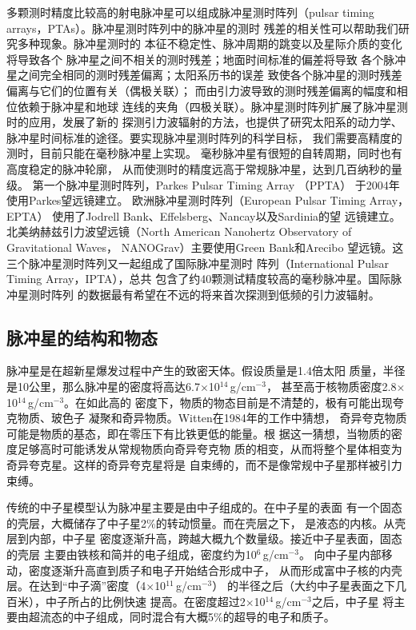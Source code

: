 多颗测时精度比较高的射电脉冲星可以组成脉冲星测时阵列（pulsar 
timing arrays，PTAs）。脉冲星测时阵列中的脉冲星的测时
残差的相关性可以帮助我们研究多种现象。脉冲星测时的
本征不稳定性、脉冲周期的跳变以及星际介质的变化将导致各个
脉冲星之间不相关的测时残差；地面时间标准的偏差将导致
各个脉冲星之间完全相同的测时残差偏离；太阳系历书的误差
致使各个脉冲星的测时残差偏离与它们的位置有关（偶极关联）；
而由引力波导致的测时残差偏离的幅度和相位依赖于脉冲星和地球
连线的夹角（四极关联）。脉冲星测时阵列扩展了脉冲星测时的应用，发展了新的
探测引力波辐射的方法，也提供了研究太阳系的动力学、
脉冲星时间标准的途径。要实现脉冲星测时阵列的科学目标，
我们需要高精度的测时，目前只能在毫秒脉冲星上实现。
毫秒脉冲星有很短的自转周期，同时也有高度稳定的脉冲轮廓，
从而使测时的精度远高于常规脉冲星，达到几百纳秒的量级。
第一个脉冲星测时阵列，Parkes Pulsar Timing Array （PPTA）
于2004年使用Parkes望远镜建立\supercite{Manchester13}。
欧洲脉冲星测时阵列（European Pulsar Timing Array，EPTA）\supercite{fvr+10}
使用了Jodrell Bank、Effelsberg、Nancay以及Sardinia的望
远镜建立。北美纳赫兹引力波望远镜（North American Nanohertz Observatory of Gravitational Waves，
NANOGrav）\supercite{jfl+09}主要使用Green Bank和Arecibo
望远镜。这三个脉冲星测时阵列又一起组成了国际脉冲星测时
阵列（International Pulsar Timing Array，IPTA），总共
包含了约40颗测试精度较高的毫秒脉冲星。国际脉冲星测时阵列
的数据最有希望在不远的将来首次探测到低频的引力波辐射。

\subsection{脉冲星的结构和物态}

脉冲星是在超新星爆发过程中产生的致密天体。假设质量是1.4倍太阳
质量，半径是10公里，那么脉冲星的密度将高达6.7$\times$10$^{14}$\,g/cm$^{-3}$，
甚至高于核物质密度2.8$\times$10$^{14}$\,g/cm$^{-3}$。在如此高的
密度下，物质的物态目前是不清楚的，极有可能出现夸克物质、玻色子
凝聚和奇异物质。Witten在1984年的工作中猜想\supercite{wit84}，
奇异夸克物质可能是物质的基态，即在零压下有比铁更低的能量。根
据这一猜想，当物质的密度足够高时可能诱发从常规物质向奇异夸克物
质的相变，从而将整个星体相变为奇异夸克星。这样的奇异夸克星将是
自束缚的，而不是像常规中子星那样被引力束缚。

传统的中子星模型认为脉冲星主要是由中子组成的。在中子星的表面
有一个固态的壳层，大概储存了中子星2\%的转动惯量。而在壳层之下，
是液态的内核。从壳层到内部，中子星
密度逐渐升高，跨越大概九个数量级。接近中子星表面，固态的壳层
主要由铁核和简并的电子组成，密度约为10$^{6}$\,g/cm$^{-3}$。
向中子星内部移动，密度逐渐升高直到质子和电子开始结合形成中子，
从而形成富中子核的内壳层。在达到“中子滴”密度（4$\times$10$^{11}$\,g/cm$^{-3}$）
的半径之后（大约中子星表面之下几百米），中子所占的比例快速
提高。在密度超过2$\times$10$^{14}$\,g/cm$^{-3}$之后，中子星
将主要由超流态的中子组成，同时混合有大概5\%的超导的电子和质子。

